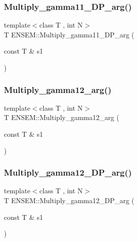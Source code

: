 \mbox{\label{namespaceENSEM_a1d3654f9af27c70c78514a313cfc9d10}} 
\subsubsection{\texorpdfstring{Multiply\_gamma11\_DP\_arg()}{Multiply\_gamma11\_DP\_arg()}}
{\footnotesize\ttfamily template$<$class T , int N$>$ \\
T E\+N\+S\+E\+M\+::\+Multiply\+\_\+gamma11\+\_\+\+D\+P\+\_\+arg (\begin{DoxyParamCaption}\item[{const T \&}]{s1 }\end{DoxyParamCaption})\hspace{0.3cm}{\ttfamily [inline]}}

\mbox{\label{namespaceENSEM_abe630fefe9bf4d743519870f8da7cd57}} 
\subsubsection{\texorpdfstring{Multiply\_gamma12\_arg()}{Multiply\_gamma12\_arg()}}
{\footnotesize\ttfamily template$<$class T , int N$>$ \\
T E\+N\+S\+E\+M\+::\+Multiply\+\_\+gamma12\+\_\+arg (\begin{DoxyParamCaption}\item[{const T \&}]{s1 }\end{DoxyParamCaption})\hspace{0.3cm}{\ttfamily [inline]}}

\mbox{\label{namespaceENSEM_a912dc326057809bf0a27f06913ddbf55}} 
\subsubsection{\texorpdfstring{Multiply\_gamma12\_DP\_arg()}{Multiply\_gamma12\_DP\_arg()}}
{\footnotesize\ttfamily template$<$class T , int N$>$ \\
T E\+N\+S\+E\+M\+::\+Multiply\+\_\+gamma12\+\_\+\+D\+P\+\_\+arg (\begin{DoxyParamCaption}\item[{const T \&}]{s1 }\end{DoxyParamCaption})\hspace{0.3cm}{\ttfamily [inline]}}

